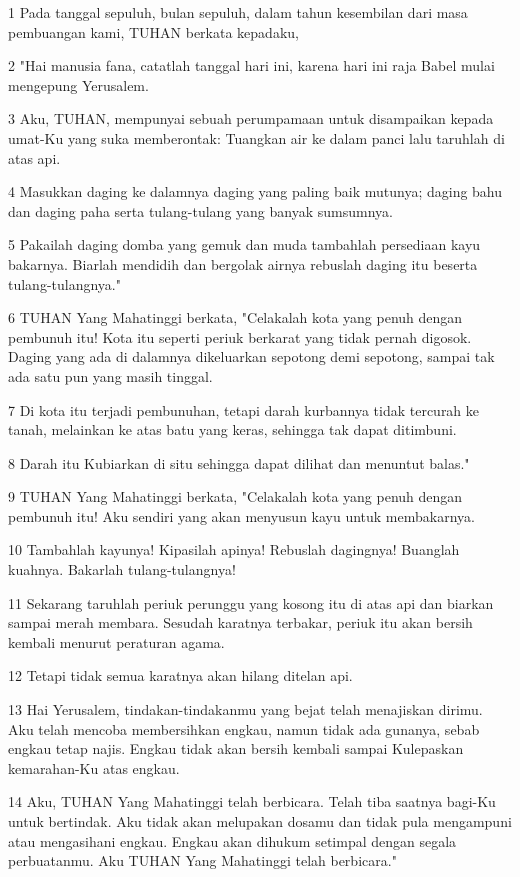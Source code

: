 \par 1 Pada tanggal sepuluh, bulan sepuluh, dalam tahun kesembilan dari masa pembuangan kami, TUHAN berkata kepadaku,
\par 2 "Hai manusia fana, catatlah tanggal hari ini, karena hari ini raja Babel mulai mengepung Yerusalem.
\par 3 Aku, TUHAN, mempunyai sebuah perumpamaan untuk disampaikan kepada umat-Ku yang suka memberontak: Tuangkan air ke dalam panci lalu taruhlah di atas api.
\par 4 Masukkan daging ke dalamnya daging yang paling baik mutunya; daging bahu dan daging paha serta tulang-tulang yang banyak sumsumnya.
\par 5 Pakailah daging domba yang gemuk dan muda tambahlah persediaan kayu bakarnya. Biarlah mendidih dan bergolak airnya rebuslah daging itu beserta tulang-tulangnya."
\par 6 TUHAN Yang Mahatinggi berkata, "Celakalah kota yang penuh dengan pembunuh itu! Kota itu seperti periuk berkarat yang tidak pernah digosok. Daging yang ada di dalamnya dikeluarkan sepotong demi sepotong, sampai tak ada satu pun yang masih tinggal.
\par 7 Di kota itu terjadi pembunuhan, tetapi darah kurbannya tidak tercurah ke tanah, melainkan ke atas batu yang keras, sehingga tak dapat ditimbuni.
\par 8 Darah itu Kubiarkan di situ sehingga dapat dilihat dan menuntut balas."
\par 9 TUHAN Yang Mahatinggi berkata, "Celakalah kota yang penuh dengan pembunuh itu! Aku sendiri yang akan menyusun kayu untuk membakarnya.
\par 10 Tambahlah kayunya! Kipasilah apinya! Rebuslah dagingnya! Buanglah kuahnya. Bakarlah tulang-tulangnya!
\par 11 Sekarang taruhlah periuk perunggu yang kosong itu di atas api dan biarkan sampai merah membara. Sesudah karatnya terbakar, periuk itu akan bersih kembali menurut peraturan agama.
\par 12 Tetapi tidak semua karatnya akan hilang ditelan api.
\par 13 Hai Yerusalem, tindakan-tindakanmu yang bejat telah menajiskan dirimu. Aku telah mencoba membersihkan engkau, namun tidak ada gunanya, sebab engkau tetap najis. Engkau tidak akan bersih kembali sampai Kulepaskan kemarahan-Ku atas engkau.
\par 14 Aku, TUHAN Yang Mahatinggi telah berbicara. Telah tiba saatnya bagi-Ku untuk bertindak. Aku tidak akan melupakan dosamu dan tidak pula mengampuni atau mengasihani engkau. Engkau akan dihukum setimpal dengan segala perbuatanmu. Aku TUHAN Yang Mahatinggi telah berbicara."
